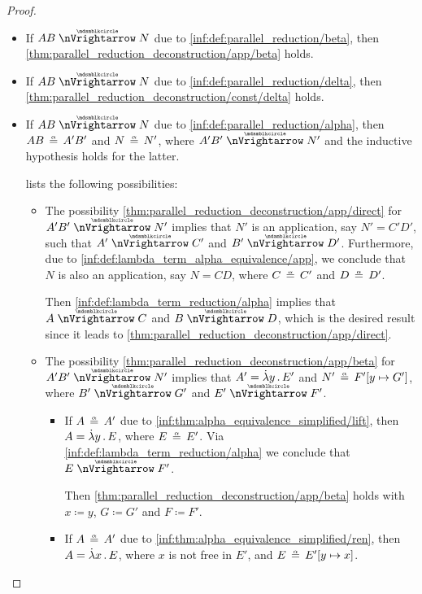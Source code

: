\begin{proof}
\begin{itemize}
    \item If \( AB \ppred N \) due to \ref{inf:def:parallel_reduction/beta}, then \cref{thm:parallel_reduction_deconstruction/app/beta} holds.

    \item If \( AB \ppred N \) due to \ref{inf:def:parallel_reduction/delta}, then \cref{thm:parallel_reduction_deconstruction/const/delta} holds.

    \item If \( AB \ppred N \) due to \ref{inf:def:parallel_reduction/alpha}, then \( AB \aequiv A' B' \) and \( N \aequiv N' \), where \( A' B' \ppred N' \) and the inductive hypothesis holds for the latter.

     lists the following possibilities:
    \begin{itemize}
      \item The possibility \cref{thm:parallel_reduction_deconstruction/app/direct} for \( A' B' \ppred N' \) implies that \( N' \) is an application, say \( N' = C' D' \), such that \( A' \ppred C' \) and \( B' \ppred D' \). Furthermore, due to \ref{inf:def:lambda_term_alpha_equivalence/app}, we conclude that \( N \) is also an application, say \( N = CD \), where \( C \aequiv C' \) and \( D \aequiv D' \).

      Then \ref{inf:def:lambda_term_reduction/alpha} implies that \( A \ppred C \) and \( B \ppred D \), which is the desired result since it leads to \cref{thm:parallel_reduction_deconstruction/app/direct}.

      \item The possibility \cref{thm:parallel_reduction_deconstruction/app/beta} for \( A' B' \ppred N' \) implies that \( A' = \qabs y E' \) and \( N' \aequiv F'[y \mapsto G'] \), where \( B' \ppred G' \) and \( E' \ppred F' \).

      \begin{itemize}
        \item If \( A \aequiv A' \) due to \ref{inf:thm:alpha_equivalence_simplified/lift}, then \( A = \qabs y E \), where \( E \aequiv E' \). Via \ref{inf:def:lambda_term_reduction/alpha} we conclude that \( E \ppred F' \).

        Then \cref{thm:parallel_reduction_deconstruction/app/beta} holds with \( x \coloneqq y \), \( G \coloneqq G' \) and \( F \coloneqq F' \).

        \item If \( A \aequiv A' \) due to \ref{inf:thm:alpha_equivalence_simplified/ren}, then \( A = \qabs x E \), where \( x \) is not free in \( E' \), and \( E \aequiv E'[y \mapsto x] \).


\end{itemize}
\end{itemize}
\end{itemize}
\end{proof}
